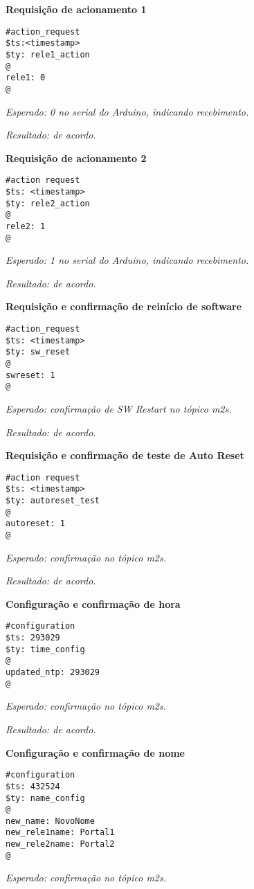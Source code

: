 \textbf{Requisição de acionamento 1}
\begin{lstlisting}
#action_request
$ts:<timestamp>
$ty: rele1_action
@
rele1: 0
@
\end{lstlisting}

\emph{Esperado: 0 no serial do Arduino, indicando recebimento.}

\emph{Resultado: de acordo.}

\textbf{Requisição de acionamento 2}
\begin{lstlisting}
#action request
$ts: <timestamp>
$ty: rele2_action
@
rele2: 1
@
\end{lstlisting}

\emph{Esperado: 1 no serial do Arduino, indicando recebimento.}

\emph{Resultado: de acordo.}

\textbf{Requisição e confirmação de reinício de software}
\begin{lstlisting}
#action_request
$ts: <timestamp>
$ty: sw_reset
@
swreset: 1
@
\end{lstlisting}

\emph{Esperado: confirmação de SW Restart no tópico \wmqtt{} m2s.}

\emph{Resultado: de acordo.}

\textbf{Requisição e confirmação de teste de Auto Reset}
\begin{lstlisting}
#action request
$ts: <timestamp>
$ty: autoreset_test
@
autoreset: 1
@
\end{lstlisting}

\emph{Esperado: confirmação no tópico \wmqtt{} m2s.}

\emph{Resultado: de acordo.}

\textbf{Configuração e confirmação de hora}
\begin{lstlisting}
#configuration
$ts: 293029
$ty: time_config
@
updated_ntp: 293029
@
\end{lstlisting}

\emph{Esperado: confirmação no tópico \wmqtt{} m2s.}

\emph{Resultado: de acordo.}

\textbf{Configuração e confirmação de nome}
\begin{lstlisting}
#configuration
$ts: 432524
$ty: name_config
@
new_name: NovoNome
new_rele1name: Portal1
new_rele2name: Portal2
@
\end{lstlisting}

\emph{Esperado: confirmação no tópico \wmqtt{} m2s.}

